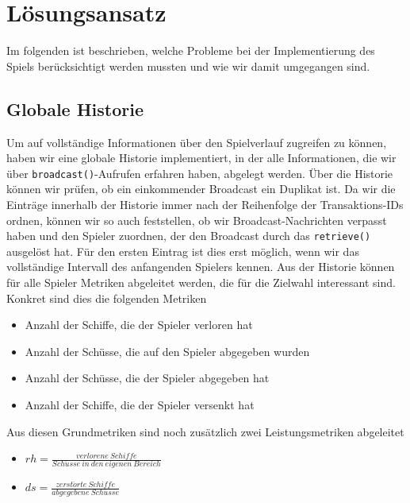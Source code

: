 
\section{Lösungsansatz}
Im folgenden ist beschrieben, welche Probleme bei der Implementierung des Spiels berücksichtigt werden mussten und wie wir damit umgegangen sind.\\

\subsection{Globale Historie}
Um auf vollständige Informationen über den Spielverlauf zugreifen zu können, haben wir eine globale Historie implementiert, in der alle Informationen, die wir über \texttt{broadcast()}-Aufrufen erfahren haben, abgelegt werden. Über die Historie können wir prüfen, ob ein einkommender Broadcast ein Duplikat ist. Da wir die Einträge innerhalb der Historie immer nach der Reihenfolge der Transaktions-IDs ordnen, können wir so auch feststellen, ob wir Broadcast-Nachrichten verpasst haben und den Spieler zuordnen, der den Broadcast durch das \texttt{retrieve()} ausgelöst hat. Für den ersten Eintrag ist dies erst möglich, wenn wir das vollständige Intervall des anfangenden Spielers kennen. Aus der Historie können für alle Spieler Metriken abgeleitet werden, die für die Zielwahl interessant sind.\\

Konkret sind dies die folgenden Metriken
\begin{itemize}
	\item Anzahl der Schiffe, die der Spieler verloren hat
	\item Anzahl der Schüsse, die auf den Spieler abgegeben wurden
	\item Anzahl der Schüsse, die der Spieler abgegeben hat
	\item Anzahl der Schiffe, die der Spieler versenkt hat
\end{itemize}

Aus diesen Grundmetriken sind noch zusätzlich zwei Leistungsmetriken abgeleitet
\begin{itemize}
	\item $ rh = \frac{verlorene\:Schiffe}{Sch\ddot{u}sse\:in\:den\:eigenen\:Bereich} $
	\item $ ds = \frac{zerst\ddot{o}rte\:Schiffe}{abgegebene\:Sch\ddot{u}sse} $
\end{itemize}

